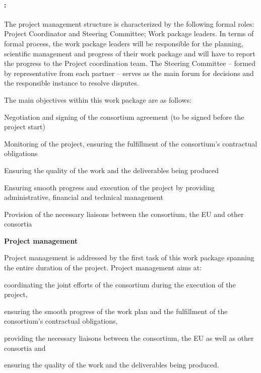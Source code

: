 
\paragraph{\WPManagement: \WPManagementTitle \\}

{\noindent\wptablefont

\wptableheaderB{\WPManagementVW}{\WPManagementETHZ}{\WPManagementIBM}{\WPManagementCLUJ}{\WPManagementPRAGUE}



The \Project{} project management structure is characterized by the following formal roles: Project Coordinator and Steering Committee; Work package leaders. In terms of formal process, the work package leaders will be responsible for the planning, scientific management and progress of their work package and will have to report the progress to the Project coordination team. The Steering Committee -- formed by representative from each partner -- serves as the main forum for decisions and the responsible instance to resolve disputes.

The main objectives within this work package are as follows:
\begin{denseItemize}
\item Negotiation and signing of the consortium agreement (to be signed before the project start)
\item Monitoring of the project, ensuring the fulfillment of the consortium's contractual obligations
\item Ensuring the quality of the work and the deliverables being produced
\item Ensuring smooth progress and execution of the project by providing administrative, financial and technical management
\item Provision of the necessary liaisons between the consortium, the EU and other consortia
\end{denseItemize}


\begin{tasks}{\WPManagementNo}
\item {\bf Project management}
\label{task:wpmanagement:management}

Project management is addressed by the first task of this work package spanning the entire duration of the project. Project management aims at:
\begin{denseItemize}
\item coordinating the joint efforts of the consortium during the execution of the project,
\item ensuring the smooth progress of the work plan and the fulfillment of the consortium's contractual obligations,
\item providing the necessary liaisons between the consortium, the EU as well as other consortia and
\item ensuring the quality of the work and the deliverables being produced.
\end{denseItemize}


\end{tasks}}
